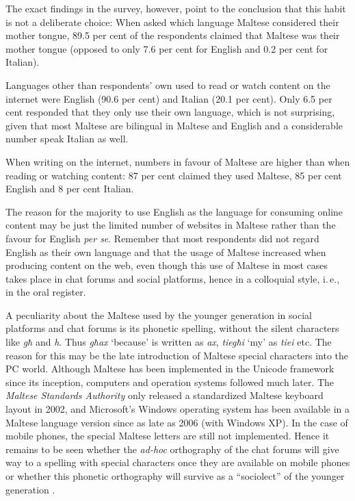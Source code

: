 \documentclass[]{../../metanetpaper}
\begin{document}
\begin{multicols}{2}
The exact findings in the survey, however, point to the conclusion that this habit is not a deliberate choice: 
When asked which language Maltese considered their mother tongue, 89.5 per cent of the respondents claimed that Maltese was their mother tongue (opposed to only 7.6 per cent for English and 0.2 per cent for Italian). 

Languages other than respondents' own used to read or watch content on the internet were English (90.6 per cent) and Italian (20.1 per cent). Only 6.5 per cent responded that they only use their own language, which is not surprising, given that most Maltese are bilingual in Maltese and English and a considerable number speak Italian as well.

When writing on the internet, numbers in favour of Maltese are higher than when reading or watching content: 87 per cent claimed they used Maltese, 85 per cent English and 8 per cent Italian. 

The reason for the majority to use English as the language for consuming online content may be just the limited number of websites in Maltese rather than the favour for English \emph{per se}. Remember that most respondents did not regard English as their own language and that the usage of Maltese increased when producing content on the web, even though this use of Maltese in most cases takes place in chat forums and social platforms, hence in a colloquial style, i.\,e., in the oral register. 

A peculiarity about the Maltese used by the younger generation in social platforms and chat forums is its phonetic spelling, without the silent characters like \emph{għ} and \emph{h}. Thus \emph{għax} `because' is written as \emph{ax}, \emph{tiegħi} `my' as \emph{tiei} etc. The reason for this may be the late introduction of Maltese special characters into the PC world. Although Maltese has been implemented in the Unicode framework since its inception, computers and operation systems followed much later. The \emph{Maltese Standards Authority} only released a standardized Maltese keyboard layout in 2002, and Microsoft's Windows operating system has been available in a Maltese language version since as late as 2006 (with Windows XP). In the case of mobile phones, the special Maltese letters are still not implemented. Hence it remains to be seen whether the \emph{ad-hoc} orthography of the chat forums will give way to a spelling with special characters once they are available on mobile phones or whether this phonetic orthography will survive as a ``sociolect'' of the younger generation \cite{Fabri:2011b}.


\end{multicols}
\end{document}
